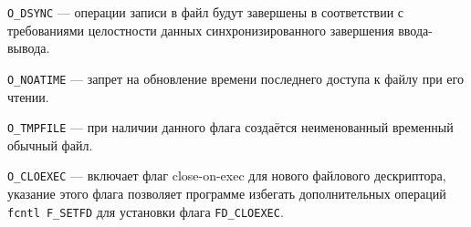 \texttt{O\_DSYNC} ---  операции записи в файл будут завершены в соответствии с
требованиями целостности данных синхронизированного завершения ввода-вывода.

\texttt{O\_NOATIME} ---  запрет на обновление времени последнего доступа к файлу
при его чтении.

\texttt{O\_TMPFILE} --- при наличии данного флага создаётся неименованный
временный обычный файл.

\texttt{O\_CLOEXEC} --- включает флаг close-on-exec для нового файлового
дескриптора, указание этого флага позволяет программе избегать дополнительных
операций \texttt{fcntl F\_SETFD} для установки флага \texttt{FD\_CLOEXEC}.
